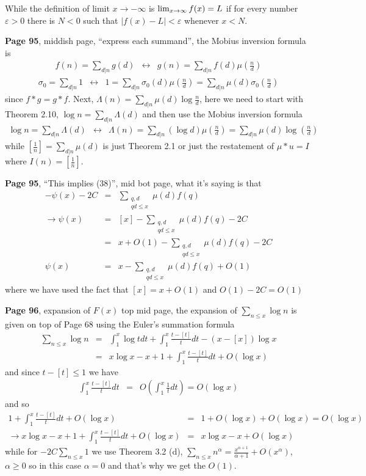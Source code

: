 \documentclass[aps,preprint,preprintnumbers,nofootinbib,showpacs,prd]{revtex4-1}
\newcommand{\nbea}{\begin{eqnarray*}}
\newcommand{\neea}{\end{eqnarray*}}
\begin{document}
While the definition of limit $x\to-\infty$ is $\lim_{x\to\-\infty}f(x) = L$ if for every number $\varepsilon>0$ there is $N<0$ such that $|f(x)-L|<\varepsilon$ whenever $x < N$.

{\bf Page 95}, middish page, ``express each summand'', the Mobius inversion formula is
%
\nbea
f(n) = \sum_{d|n} g(d) &\longleftrightarrow& g(n) = \sum_{d|n} f(d)\mu\left(\frac{n}{d}\right)
\neea
%
%
\nbea
\sigma_0 = \sum_{d|n} 1 &\longleftrightarrow& 1 = \sum_{d|n}\sigma_0(d)\mu\left(\frac{n}{d}\right) = \sum_{d|n}\mu(d)\sigma_0\left(\frac{n}{d}\right)
\neea
%
since $f*g = g*f$. Next, $\Lambda(n) = \sum_{d|n}\mu(d)\log\frac{n}{d}$, here we need to start with Theorem 2.10, $\log n = \sum_{d|n}\Lambda(d)$ and then use the Mobius inversion formula
%
\nbea
\log n = \sum_{d|n}\Lambda(d) &\longleftrightarrow& \Lambda(n) = \sum_{d|n} (\log d) \mu\left ( \frac{n}{d} \right ) = \sum_{d|n} \mu (d) \log\left ( \frac{n}{d} \right )
\neea
%
while $\left \lbrack \frac{1}{n}\right \rbrack = \sum_{d|n} \mu(d)$ is just Theorem 2.1 or just the restatement of $\mu * u = I$ where $I(n) = \left \lbrack \frac{1}{n}\right \rbrack$.

{\bf Page 95}, ``This implies (38)'', mid bot page, what it's saying is that
%
\nbea
[x] - \psi(x) - 2C & = & \sum_{\substack{q,d\\ qd\le x}}\mu(d)f(q) \\
\to \psi(x) & = & [x] - \sum_{\substack{q,d\\ qd\le x}}\mu(d)f(q) - 2C \\
& = & x + O(1) - \sum_{\substack{q,d\\ qd\le x}}\mu(d)f(q) - 2C \\
\psi(x) & = & x - \sum_{\substack{q,d\\ qd\le x}}\mu(d)f(q)  + O(1)
\neea
%
where we have used the fact that $[x] = x + O(1)$ and $O(1) - 2C = O(1)$

{\bf Page 96}, expansion of $F(x)$ top mid page, the expansion of $\sum_{n\le x} \log n$ is given on top of Page 68 using the Euler's summation formula
%
\nbea
\sum_{n\le x}\log n & = & \int_1^x \log t dt + \int_1^x\frac{t-[t]}{t} dt - (x-[x])\log x \\
& = & x\log x - x + 1 + \int_1^x\frac{t-[t]}{t}dt + O(\log x)
\neea
%
and since $t-[t]\le 1$ we have
%
\nbea
\int_1^x\frac{t-[t]}{t}dt & = & O\left(\int_1^x\frac{1}{t}dt\right) = O(\log x)
\neea
%
and so
%
\nbea
1 + \int_1^x\frac{t-[t]}{t}dt + O(\log x) & = & 1 + O(\log x) + O(\log x) = O(\log x) \\
\to x\log x - x + 1 + \int_1^x\frac{t-[t]}{t}dt + O(\log x) & = & x\log x - x + O(\log x)
\neea
%
while for $-2C\sum_{n\le x}1$ we use Theorem 3.2 (d), $\sum_{n\le x}n^\alpha = \frac{x^{\alpha+1}}{\alpha+1} + O(x^\alpha)$, $\alpha\ge 0$ so in this case $\alpha=0$ and that's why we get the $O(1)$.
\end{document}
